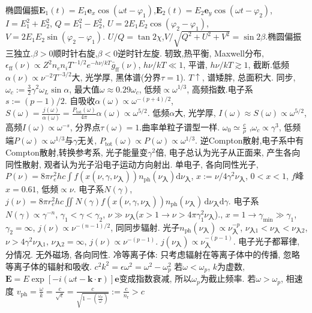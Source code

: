 \documentclass[12pt]{ctexart}
\def\b{\boldsymbol}
\def\d{\mathrm{d}}
\theoremstyle{definition}
\begin{document}
椭圆偏振$\b{E}_1(t)=E_1\b{e}_x\cos(\omega t-\varphi_1)$,$\b{E}_2(t)=E_2\b{e}_y\cos(\omega t-\varphi_2)$,$I=E_1^2+E_2^2$,
$Q=E_1^2-E_2^2$,
$U=2E_1E_2\cos(\varphi_2-\varphi_1)$,
$V=2E_1E_2\sin(\varphi_2-\varphi_1)$.
$U/Q=\tan2\chi$,$V/\sqrt{Q^2+U^2+V^2}=\sin2\beta$.椭圆偏振三独立.$\beta>0$顺时针右旋,$\beta<0$逆时针左旋.
轫致,热平衡, Maxwell分布, $\epsilon_\text{ff}(\nu)\propto Z^2n_en_iT^{-1/2}e^{-h\nu/kT}\bar{g}_\text{ff}(\nu)$,
$h\nu/kT\ll1$, 平谱, $h\nu/kT\gtrsim1$, 截断.低频$\alpha(\nu)\propto \nu^{-2}T^{-3/2}$大, 光学厚, 黑体谱(分界$\tau=1$). $T\uparrow$, 谱矮胖, 总面积大.
同步,$\omega_c:=\frac{3}{2}\gamma^2\omega_L\sin\alpha$, 最大值$\omega\approx0.29\omega_c$, 低频$\propto\omega^{1/3}$, 高频指数.电子系$s:=(p-1)/2$.
自吸收$\alpha(\omega)\propto\omega^{-(p+4)/2}$, $S(\omega)=\frac{j(\omega)}{\alpha(\omega)}=\frac{P_\text{tot}(\omega)}{4\pi}\alpha(\omega)\propto\omega^{5/2}$. 低频$\alpha$大, 光学厚, $I(\omega)\approx S(\omega)\propto\omega^{5/2}$, 高频$I(\omega)\propto\omega^{-s}$, 分界点$\tau(\omega)=1$.曲率单粒子谱型一样. $\omega_0\simeq\frac{c}{\rho}$ ,$\omega_c\propto\gamma^3$, 低频端$P(\omega)\propto\omega^{1/3}$与$\gamma$无关, $P_\text{tot}(\omega)\propto P(\omega)\propto\omega^{1/3}$.
逆Compton散射,电子系中有Compton散射,转换参考系, 光子能量变$\gamma^2$倍, 电子总认为光子从正面来, 产生各向同性散射, 观者认为光子沿电子运动方向射出.
单电子, 各向同性光子,    $P(\nu)=8\pi r_e^2hc\int f(x(\nu,\gamma,\nu_\text{入}))n_\text{ph}(\nu_\text{入})\d\nu_\text{入}$,
$x:=\nu/4\gamma^2\nu_\text{入}$, $0<x<1$, $f$峰$x=0.61$, 低频$\propto\nu$.
电子系$N(\gamma)$,$j(\nu)=8\pi r_e^2hc\iint N(\gamma)f(x(\nu,\gamma,\nu_\text{入}))n_\text{ph}(\nu_\text{入})\,\d\nu_\text{入}\d\gamma$.
电子系$N(\gamma)\propto\gamma^{-n}$, $\gamma_1<\gamma<\gamma_2$, $\nu\gg\nu_\text{入}$($x>1\to\nu>4\pi\gamma_{1}^2\nu_\text{入}$)., $x=1\to\gamma_\text{min}\gg\gamma_1$, $\gamma_2=\infty$, $j(\nu)\propto\nu^{-(n-1)/2}$, 同同步辐射.
光子$n_\text{ph}(\nu_\text{入})\propto\nu_\text{入}^{-p}$, $\nu_\text{入1}<\nu_\text{入}<\nu_\text{入2}$, $\nu>4\gamma^2\nu_\text{入1}$, $\nu_\text{入2}=\infty$, $j(\nu)\propto\nu^{-(p-1)}$. $j(\nu_\text{入})\propto\nu_\text{入}^{-(p-1)}$.
电子光子都幂律, 分情况.
无外磁场, 各向同性.
冷等离子体: 只考虑辐射在等离子体中的传播, 忽略等离子体的辐射和吸收.
$c^2k^2=\epsilon\omega^2=\omega^2-\omega_p^2$
若$\omega<\omega_p$, $k$为虚数, $\b{E}=E\exp[-i(\omega t-\b{k}\cdot\b{r})]\b{e}$变成指数衰减, 所以$\omega_p$为截止频率.
若$\omega>\omega_p$, 相速度
$v_\text{ph}=\frac{\omega}{k}=\frac{c}{\sqrt{\epsilon}}=\frac{c}{\sqrt{1-\left(\frac{\omega_p}{\omega}\right)}}:=\frac{c}{n_\text{r}}>c$
\end{document}
